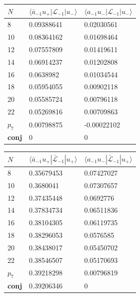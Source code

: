 \documentclass[a4paper,10pt]{article}
\begin{document}
\begin{table}[H]
\center
\begin{minipage}{0.5\linewidth}
\center
\begin{tabular}{lll}
$N$    & $\langle \bar{a}_{-1} u_+  | {\mathcal L}_{-1} | u_- \rangle$ & $\langle a_{-1} u_- | {\mathcal L}_{-1} | u_- \rangle$   \\
\hline
8 & 0.09388641 & 0.02030561 \\
10 & 0.08364162 & 0.01698464 \\
12 & 0.07557809 & 0.01419611 \\
14 & 0.06914237 & 0.01202808 \\
16 & 0.0638982 & 0.01034544 \\
18 & 0.05954055 & 0.00902118 \\
20 & 0.05585724 & 0.00796118 \\
22 & 0.05269816 & 0.00709863 \\
$p_7$ & 0.00798875 & \hspace*{-3.5pt}-0.00022102 \\
\bf{conj} & 0 & 0 \\
\hline
\end{tabular}
\end{minipage}%
\begin{minipage}{0.5\linewidth}
\center
\begin{tabular}{lll}
$N$   & $\langle \bar{a}_{-1} u_+ | \bar{\mathcal L}_{-1} | u_+ \rangle$ & $\langle a_{-1} u_-  | \bar{\mathcal L}_{-1} | u_+ \rangle$  \\
\hline
8 & 0.35679453 & 0.07427027 \\
10 & 0.3680041 & 0.07307657 \\
12 & 0.37435448 & 0.0692776 \\
14 & 0.37834734 & 0.06511836 \\
16 & 0.38104305 & 0.06119735 \\
18 & 0.38296053 & 0.0576585 \\
20 & 0.38438017 & 0.05450702 \\
22 & 0.38546507 & 0.05170693 \\
$p_7$ & 0.39218298 & 0.00796819 \\
\bf{conj} & 0.39206346 & 0 \\
\hline
\end{tabular}
\end{minipage}%

\vspace*{10pt}


\end{table}
\end{document}
